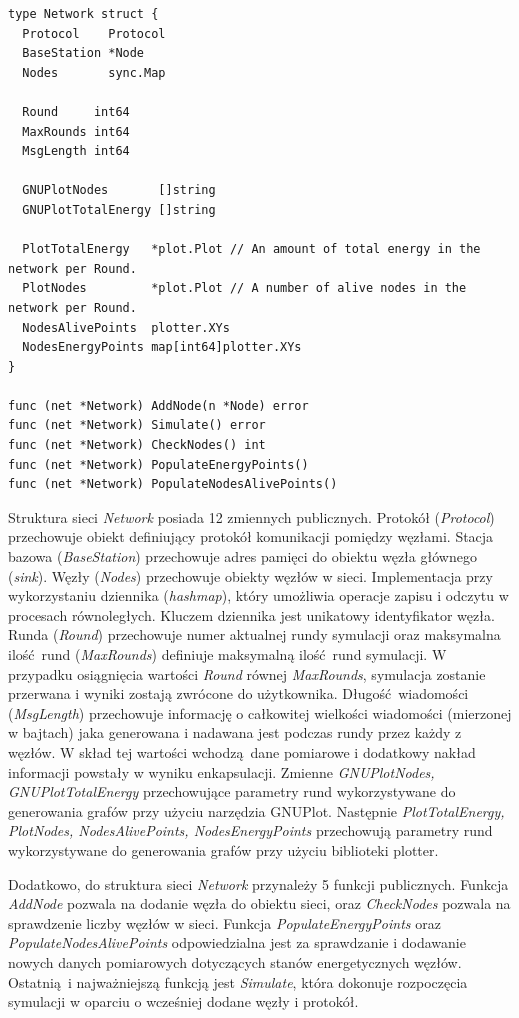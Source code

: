 \documentclass[a4paper,12pt,twoside,openany]{report}
\begin{document}
\begin{lstlisting}
type Network struct {
  Protocol    Protocol
  BaseStation *Node
  Nodes       sync.Map

  Round     int64
  MaxRounds int64
  MsgLength int64

  GNUPlotNodes       []string
  GNUPlotTotalEnergy []string

  PlotTotalEnergy   *plot.Plot // An amount of total energy in the network per Round.
  PlotNodes         *plot.Plot // A number of alive nodes in the network per Round.
  NodesAlivePoints  plotter.XYs
  NodesEnergyPoints map[int64]plotter.XYs
}

func (net *Network) AddNode(n *Node) error
func (net *Network) Simulate() error
func (net *Network) CheckNodes() int
func (net *Network) PopulateEnergyPoints()
func (net *Network) PopulateNodesAlivePoints()
\end{lstlisting}

Struktura sieci \textit{Network} posiada 12 zmiennych publicznych. Protokół (\textit{Protocol}) przechowuje obiekt definiujący protokół komunikacji pomiędzy węzłami.
Stacja bazowa (\textit{BaseStation}) przechowuje adres pamięci do obiektu węzła głównego (\textit{sink}).
Węzły (\textit{Nodes}) przechowuje obiekty węzłów w sieci. Implementacja przy wykorzystaniu dziennika (\textit{hashmap}), który umożliwia operacje zapisu i odczytu w procesach równoległych. 
Kluczem dziennika jest unikatowy identyfikator węzła. Runda (\textit{Round}) przechowuje numer aktualnej rundy symulacji oraz maksymalna ilość rund (\textit{MaxRounds}) definiuje maksymalną ilość rund symulacji. 
W przypadku osiągnięcia wartości \textit{Round} równej \textit{MaxRounds}, symulacja zostanie przerwana i wyniki zostają zwrócone do użytkownika.
Długość wiadomości (\textit{MsgLength}) przechowuje informację o całkowitej wielkości wiadomości (mierzonej w bajtach) jaka generowana i nadawana jest podczas rundy przez każdy z węzłów. 
W skład tej wartości wchodzą dane pomiarowe i dodatkowy nakład informacji powstały w wyniku enkapsulacji.
Zmienne \textit{GNUPlotNodes, GNUPlotTotalEnergy} przechowujące parametry rund wykorzystywane do generowania grafów przy użyciu narzędzia GNUPlot. 
Następnie \textit{PlotTotalEnergy, PlotNodes, NodesAlivePoints, NodesEnergyPoints} przechowują parametry rund wykorzystywane do generowania grafów przy użyciu biblioteki plotter.

Dodatkowo, do struktura sieci \textit{Network} przynależy 5 funkcji publicznych. 
Funkcja \textit{AddNode} pozwala na dodanie węzła do obiektu sieci, oraz \textit{CheckNodes} pozwala na sprawdzenie liczby węzłów w sieci.
Funkcja \textit{PopulateEnergyPoints} oraz \textit{PopulateNodesAlivePoints} odpowiedzialna jest za sprawdzanie i dodawanie nowych danych pomiarowych dotyczących stanów energetycznych węzłów.
Ostatnią i najważniejszą funkcją jest \textit{Simulate}, która dokonuje rozpoczęcia symulacji w oparciu o wcześniej dodane węzły i protokół.
\end{document}
